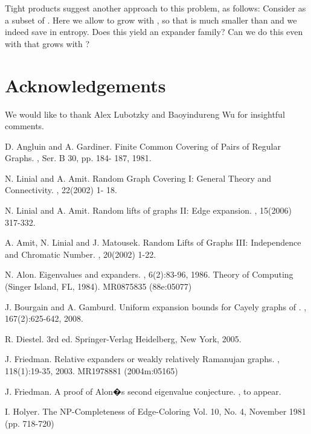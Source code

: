 \documentclass[12pt]{article}
\newtheorem{open question}[theorem]{Open question}
\begin{document}
Tight products suggest another approach to this problem, as follows:
Consider  as a subset of . Here we allow  to grow with ,
so that  is much smaller than  and we indeed save in entropy.
Does this yield an expander family? Can we do this even with  that grows with ?

\section*{Acknowledgements}
We would like to thank Alex Lubotzky and Baoyindureng Wu for insightful comments.

\begin{thebibliography}{FMT06}

D. Angluin and A. Gardiner.
\newblock Finite Common Covering of Pairs of Regular Graphs.
, Ser. B 30, pp. 184- 187, 1981.

N. Linial and A. Amit.
\newblock Random Graph Covering I: General Theory and Connectivity.
, 22(2002) 1- 18.

N. Linial and A. Amit.
\newblock Random lifts of graphs II: Edge expansion.
, 15(2006) 317-332. 

A. Amit, N. Linial and J. Matousek.
\newblock Random Lifts of Graphs III: Independence and Chromatic Number.
, 20(2002) 1-22.

N. Alon.
\newblock Eigenvalues and expanders.
, 6(2):83-96, 1986. Theory of Computing (Singer Island, FL, 1984). MR0875835 (88e:05077)

J. Bourgain and A. Gamburd.
\newblock Uniform expansion bounds for Cayely graphs of .
, 167(2):625-642, 2008. 

R. Diestel.
 3rd ed.
\newblock Springer-Verlag Heidelberg, New York, 2005.


J. Friedman.
\newblock Relative expanders or weakly relatively Ramanujan graphs.
, 118(1):19-35, 2003. MR1978881 (2004m:05165)

J. Friedman.
\newblock A proof of Alon�s second eigenvalue conjecture.
, to appear.

I. Holyer.
\newblock The NP-Completeness of Edge-Coloring
 Vol. 10, No. 4, November 1981 (pp. 718-720)


\end{thebibliography}
\end{document}
